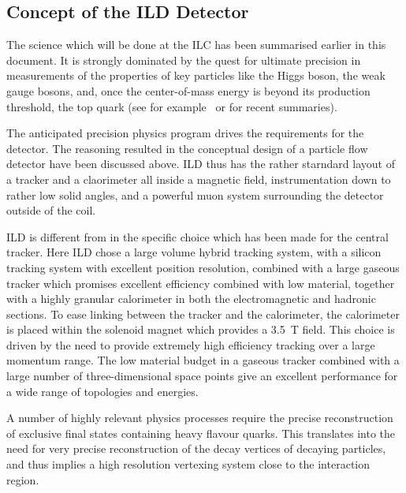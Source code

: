 \subsection{Concept of the ILD Detector}
The science which will be done at the ILC has been summarised earlier in this document. It is strongly dominated by the quest for ultimate precision in measurements of the properties of key particles like the Higgs boson, the weak gauge bosons, and, once the center-of-mass energy is beyond its production threshold, the top quark (see for example~\cite{Fujii:2017vwa} or \cite{ILCESU1} for recent summaries). 


The anticipated precision physics program drives the requirements for the detector. The reasoning resulted in the conceptual design of a particle flow detector have been discussed above. ILD thus has the rather starndard layout of a tracker and a claorimeter all inside a magnetic field, instrumentation down to rather low solid angles, and a powerful muon system surrounding the detector outside of the coil.

ILD is different from in the specific choice which has been made for the central tracker. Here ILD chose a large volume hybrid tracking system, with a silicon tracking system with excellent position resolution, combined with a large gaseous tracker which promises excellent efficiency combined with low material, together with a highly granular calorimeter in both the electromagnetic and hadronic sections. To ease linking between the tracker and the calorimeter, the calorimeter is placed within the solenoid magnet which provides a 3.5~T field. This choice is driven by the need to provide extremely high efficiency tracking over a large momentum range. The low material budget in a gaseous tracker combined with a large number of three-dimensional space points give an excellent performance for a wide range of topologies and energies.

A number of highly relevant physics processes require the precise reconstruction of exclusive final states containing heavy flavour quarks. This translates into the need for very precise reconstruction of the decay vertices of decaying particles, and thus implies a high resolution vertexing system close to the interaction region. 

